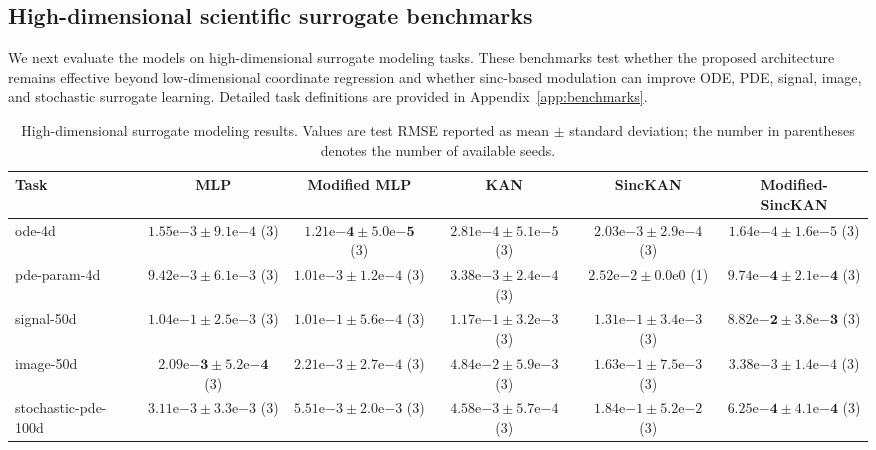 \documentclass[preprint,12pt]{elsarticle}
\begin{document}
\subsection{High-dimensional scientific surrogate benchmarks}

We next evaluate the models on high-dimensional surrogate modeling tasks. These benchmarks test whether the proposed architecture remains effective beyond low-dimensional coordinate regression and whether sinc-based modulation can improve ODE, PDE, signal, image, and stochastic surrogate learning. Detailed task definitions are provided in Appendix~\ref{app:benchmarks}.

\begin{table}[t]
\centering
\caption{High-dimensional surrogate modeling results. Values are test RMSE reported as mean \(\pm\) standard deviation; the number in parentheses denotes the number of available seeds.}
\label{tab:surrogate}
\scriptsize
\setlength{\tabcolsep}{2pt}
\renewcommand{\arraystretch}{1.05}
\begin{tabular*}{\textwidth}{@{\extracolsep{\fill}}lccccc@{}}
\toprule
Task & MLP & Modified MLP & KAN & SincKAN & Modified-SincKAN \\
\midrule
ode-4d & \(1.55\mathrm{e}{-3}\pm9.1\mathrm{e}{-4}\) (3) & \(\mathbf{1.21\mathrm{e}{-4}\pm5.0\mathrm{e}{-5}}\) (3) & \(2.81\mathrm{e}{-4}\pm5.1\mathrm{e}{-5}\) (3) & \(2.03\mathrm{e}{-3}\pm2.9\mathrm{e}{-4}\) (3) & \(1.64\mathrm{e}{-4}\pm1.6\mathrm{e}{-5}\) (3) \\
pde-param-4d & \(9.42\mathrm{e}{-3}\pm6.1\mathrm{e}{-3}\) (3) & \(1.01\mathrm{e}{-3}\pm1.2\mathrm{e}{-4}\) (3) & \(3.38\mathrm{e}{-3}\pm2.4\mathrm{e}{-4}\) (3) & \(2.52\mathrm{e}{-2}\pm0.0\mathrm{e}{0}\) (1) & \(\mathbf{9.74\mathrm{e}{-4}\pm2.1\mathrm{e}{-4}}\) (3) \\
signal-50d & \(1.04\mathrm{e}{-1}\pm2.5\mathrm{e}{-3}\) (3) & \(1.01\mathrm{e}{-1}\pm5.6\mathrm{e}{-4}\) (3) & \(1.17\mathrm{e}{-1}\pm3.2\mathrm{e}{-3}\) (3) & \(1.31\mathrm{e}{-1}\pm3.4\mathrm{e}{-3}\) (3) & \(\mathbf{8.82\mathrm{e}{-2}\pm3.8\mathrm{e}{-3}}\) (3) \\
image-50d & \(\mathbf{2.09\mathrm{e}{-3}\pm5.2\mathrm{e}{-4}}\) (3) & \(2.21\mathrm{e}{-3}\pm2.7\mathrm{e}{-4}\) (3) & \(4.84\mathrm{e}{-2}\pm5.9\mathrm{e}{-3}\) (3) & \(1.63\mathrm{e}{-1}\pm7.5\mathrm{e}{-3}\) (3) & \(3.38\mathrm{e}{-3}\pm1.4\mathrm{e}{-4}\) (3) \\
stochastic-pde-100d & \(3.11\mathrm{e}{-3}\pm3.3\mathrm{e}{-3}\) (3) & \(5.51\mathrm{e}{-3}\pm2.0\mathrm{e}{-3}\) (3) & \(4.58\mathrm{e}{-3}\pm5.7\mathrm{e}{-4}\) (3) & \(1.84\mathrm{e}{-1}\pm5.2\mathrm{e}{-2}\) (3) & \(\mathbf{6.25\mathrm{e}{-4}\pm4.1\mathrm{e}{-4}}\) (3) \\
\bottomrule
\end{tabular*}
\end{table}
\end{document}
